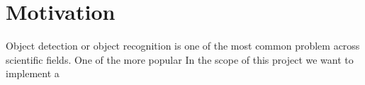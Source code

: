 \newcommand{\feat}{\texttt}







\section{Motivation}
Object detection or object recognition is one of the most common problem across scientific fields. One of the more popular In the scope of this project we want to implement a 

